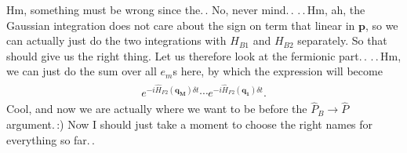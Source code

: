 \documentclass{report}
\begin{document}
Hm, something must be wrong since the.\,. No, never mind.\,. .\,.\,Hm, ah, the Gaussian integration does not care about the sign on term that linear in $\boldsymbol{p}$, so we can actually just do the two integrations with $H_{B1}$ and $H_{B2}$ separately. So that should give us the right thing. Let us therefore look at the fermionic part.\,. .\,.\,Hm, we can just do the sum over all $e_m$s here, by which the expression will become
\begin{align}
\begin{aligned}
	e^{-i  \hat H_{F2}(\boldsymbol{q_M}) \delta t} \cdots 
	e^{-i  \hat H_{F2}(\boldsymbol{q_1}) \delta t}.
\end{aligned}
\end{align} 
Cool, and now we are actually where we want to be before the $\hat P_B \to \hat P$ argument.\,:) Now I should just take a moment to choose the right names for everything so far.\,. 
\end{document}
